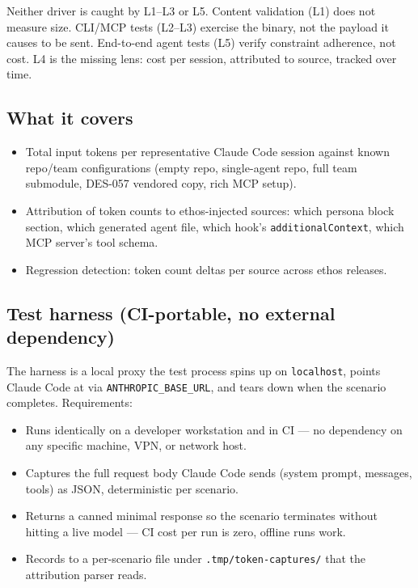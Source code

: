 \documentclass[a4paper,10pt]{article}
\newcommand{\field}[1]{\texttt{#1}}
\newcommand{\fpath}[1]{\texttt{#1}}
\begin{document}
Neither driver is caught by L1--L3 or L5.  Content validation (L1)
does not measure size.  CLI/MCP tests (L2--L3) exercise the binary,
not the payload it causes to be sent.  End-to-end agent tests (L5)
verify constraint adherence, not cost.  L4 is the missing lens: cost
per session, attributed to source, tracked over time.

\subsection*{What it covers}

\begin{itemize}
  \item Total input tokens per representative Claude Code session
    against known repo/team configurations (empty repo, single-agent
    repo, full team submodule, DES-057 vendored copy, rich MCP setup).
  \item Attribution of token counts to ethos-injected sources: which
    persona block section, which generated agent file, which hook's
    \field{additionalContext}, which MCP server's tool schema.
  \item Regression detection: token count deltas per source across
    ethos releases.
\end{itemize}

\subsection*{Test harness (CI-portable, no external dependency)}

The harness is a local proxy the test process spins up on
\texttt{localhost}, points Claude Code at via
\texttt{ANTHROPIC\_BASE\_URL}, and tears down when the scenario
completes.  Requirements:

\begin{itemize}
  \item Runs identically on a developer workstation and in CI --- no
    dependency on any specific machine, VPN, or network host.
  \item Captures the full request body Claude Code sends (system
    prompt, messages, tools) as JSON, deterministic per scenario.
  \item Returns a canned minimal response so the scenario terminates
    without hitting a live model --- CI cost per run is zero, offline
    runs work.
  \item Records to a per-scenario file under \fpath{.tmp/token-captures/}
    that the attribution parser reads.
\end{itemize}
\end{document}
